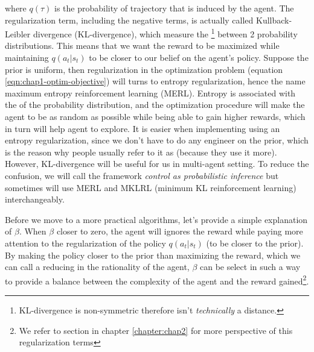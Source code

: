 where $q(\tau)$ is the probability of trajectory that is induced by the agent. The regularization term, including the negative terms, is actually called Kullback-Leibler divergence (KL-divergence), which measure the \footnote{KL-divergence is non-symmetric therefore isn't \textit{technically} a distance.} between 2 probability distributions. This means that we want the reward to be maximized while maintaining $q(a_t | s_t)$ to be closer to our  belief on the agent's policy. Suppose the prior is uniform, then regularization in the optimization problem (equation \ref{eqn:chap1-optim-objective}) will turns to entropy regularization, hence the name maximum entropy reinforcement learning (MERL). Entropy is associated with the  of the probability distribution, and the optimization procedure will make the agent to be as random as possible while being able to gain higher rewards, which in turn will help agent to explore. It is easier when implementing using an entropy regularization, since we don't have to do any engineer on the prior, which is the reason why people usually refer to it as  (because they use it more). However, KL-divergence will be useful for us in multi-agent setting. To reduce the confusion, we will call the framework \textit{control as probabilistic inference} but sometimes will use MERL and MKLRL (minimum KL reinforcement learning) interchangeably. 

Before we move to a more practical algorithms, let's provide a simple explanation of $\beta$. When $\beta$ closer to zero, the agent will ignores the reward while paying more attention to the regularization of the policy $q(a_t | s_t)$ (to be closer to the prior). By making the policy closer to the prior than maximizing the reward, which we can call a reducing in the rationality of the agent, $\beta$ can be select in such a way to provide a balance between the complexity of the agent and the reward gained\footnote{We refer to section in chapter \ref{chapter:chap2} for more perspective of this regularization terms}. 

